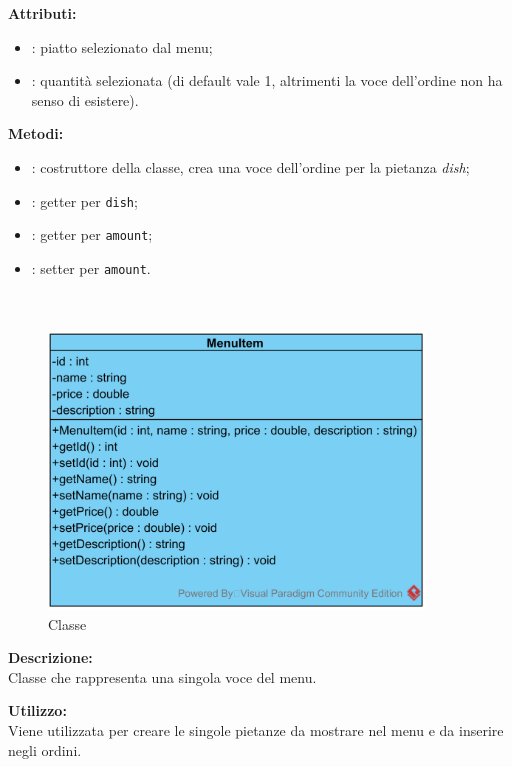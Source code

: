 \textbf{Attributi:}
\begin{itemize}
	\item {}: piatto selezionato dal menu;
	\item {}: quantità selezionata (di default vale 1, altrimenti la voce dell'ordine non ha senso di esistere).
\end{itemize}

\textbf{Metodi:}
\begin{itemize}
	\item {}: costruttore della classe, crea una voce dell'ordine per la pietanza \emph{dish};
	\item {}: getter per \texttt{dish};
	\item {}: getter per \texttt{amount};
	\item {}: setter per \texttt{amount}.
\end{itemize}


\paragraph[::MenuItem]{\class}\mbox{}\\ \label{\class}
\begin{figure}[H]
	\centering
	\includegraphics[width=10cm]{./diagrammi/demo/server/menuitem.png}
	\caption{Classe \class}
\end{figure}
\textbf{Descrizione:}\\
Classe che rappresenta una singola voce del menu.

\textbf{Utilizzo:}\\
Viene utilizzata per creare le singole pietanze da mostrare nel menu e da inserire negli ordini.

